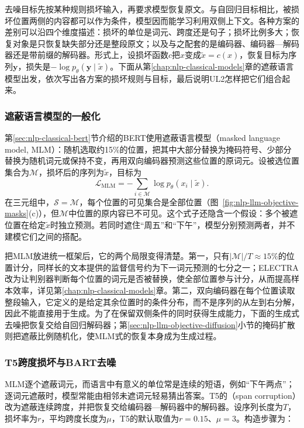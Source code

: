 去噪目标先按某种规则损坏输入，再要求模型恢复原文。与自回归目标相比，被损坏位置两侧的内容都可以作为条件，模型因而能学习利用双侧上下文。各种方案的差别可以沿四个维度描述：损坏的单位是词元、跨度还是句子；损坏比例多大；恢复对象是只恢复缺失部分还是整段原文；以及与之配套的是编码器、编码器—解码器还是带前缀的解码器。形式上，设损坏函数$c$把$x$变成$\tilde x=c(x)$，恢复目标为序列$\bm y$，损失是$-\log p_\theta(\bm y\mid\tilde x)$。下面从第\ref{chap:nlp-classical-models}章的遮蔽语言模型出发，依次写出各方案的损坏规则与目标，最后说明UL2怎样把它们组合起来。

\subsubsection{遮蔽语言模型的一般化}
\label{sec:nlp-llm-objective-mlm}

第\ref{sec:nlp-classical-bert}节介绍的BERT使用遮蔽语言模型（masked language model, MLM）：随机选取约15\%的位置，把其中大部分替换为掩码符号、少部分替换为随机词元或保持不变，再用双向编码器预测这些位置的原词元。设被选位置集合为$\mathcal M$，损坏后的序列为$\tilde x$，目标为
\[
 \mathcal L_{\mathrm{MLM}}=-\sum_{i\in\mathcal M}\log p_\theta(x_i\mid\tilde x).
\]
在三元组中，$\mathcal S=\mathcal M$，每个位置的可见集合是全部位置（图~\ref{fig:nlp-llm-objective-masks}(c)），但$\mathcal M$中位置的原内容已不可见。这个式子还隐含一个假设：多个被遮位置在给定$\tilde x$时独立预测。若同时遮住“周五”和“下午”，模型分别预测两者，并不建模它们之间的搭配。

把MLM放进统一框架后，它的两个局限变得清楚。第一，只有$|\mathcal M|/T\approx15\%$的位置计分，同样长的文本提供的监督信号约为下一词元预测的七分之一；ELECTRA改为让判别器判断每个位置的词元是否被替换，使全部位置参与计分，从而提高样本效率，详见第\ref{chap:nlp-classical-models}章。第二，双向编码器在每个位置读取整段输入，它定义的是给定其余位置时的条件分布，而不是序列的从左到右分解，因此不能直接用于生成。为了在保留双侧条件的同时获得生成能力，下面的生成式去噪把恢复交给自回归解码器；第\ref{sec:nlp-llm-objective-diffusion}小节的掩码扩散则把遮蔽比例随机化，使MLM式的恢复本身成为生成过程。

\subsubsection{T5跨度损坏与BART去噪}
\label{sec:nlp-llm-objective-t5-bart}

MLM逐个遮蔽词元，而语言中有意义的单位常是连续的短语，例如“下午两点”；逐词元遮蔽时，模型常能由相邻未遮词元轻易猜出答案。T5的（span corruption）改为遮蔽连续跨度，并把恢复交给编码器—解码器中的解码器。设序列长度为$T$，损坏率为$r$，平均跨度长度为$\mu$，T5的默认取值为$r=0.15$、$\mu=3$。构造步骤为：

